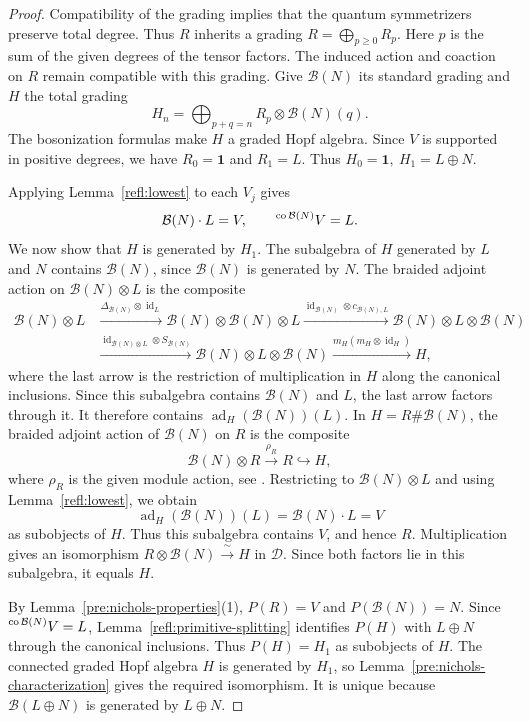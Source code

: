 \documentclass[11pt, a4paper]{article}
\numberwithin{equation}{section}
\newcommand{\D}{\mathcal D}
\newcommand{\B}{\mathcal B}
\newcommand{\one}{\mathbf 1}
\DeclareMathOperator{\id}{id}
\DeclareMathOperator{\ad}{ad}
\DeclareMathOperator{\co}{co}
\begin{document}
\begin{proof}
Compatibility of the grading implies that the quantum
symmetrizers preserve total degree. Thus $R$ inherits a grading
$
 R=\bigoplus_{p\geq0}R_p.
$
Here $p$ is the sum of the given degrees of the tensor factors.
The induced action and coaction on $R$ remain compatible
with this grading.
Give $\B(N)$ its standard grading and $H$ the total grading
\[
 H_n=\bigoplus_{p+q=n}R_p\otimes\B(N)(q).
\]
The bosonization formulas make $H$ a graded Hopf algebra.
Since $V$ is supported in positive degrees, we have
$R_0=\one$ and $R_1=L$. Thus
$
 H_0=\one,\ H_1=L\oplus N.
$

Applying Lemma~\ref{refl:lowest} to each $V_j$ gives
\[
 \B(N)\cdot L=V,
 \qquad
 \prescript{\co\B(N)}{}{V}=L.
\]
We now show that $H$ is generated by $H_1$.
The subalgebra of $H$ generated by $L$ and $N$
contains $\B(N)$, since $\B(N)$ is generated by $N$.
The braided adjoint action on $\B(N)\otimes L$ is the composite
\[
\begin{aligned}
 \B(N)\otimes L
 &\xrightarrow{\Delta_{\B(N)}\otimes\id_L}
 \B(N)\otimes\B(N)\otimes L
 \xrightarrow{\id_{\B(N)}\otimes c_{\B(N),L}}
 \B(N)\otimes L\otimes\B(N)\\
 &\xrightarrow{\id_{\B(N)\otimes L}\otimes S_{\B(N)}}
 \B(N)\otimes L\otimes\B(N)
 \xrightarrow{m_H(m_H\otimes\id_H)} H,
\end{aligned}
\]
where the last arrow is the restriction of multiplication
in $H$ along the canonical inclusions.
 {Since this} subalgebra contains $\B(N)$ and $L$, the last
arrow  {factors through it}.  {It therefore contains}
$\ad_H(\B(N))(L)$.
In $H=R\#\B(N)$, the braided adjoint action of $\B(N)$
on $R$ is the composite
\[
 \B(N)\otimes R\xrightarrow{\rho_R}R\hookrightarrow H,
\]
where $\rho_R$ is the given module action, {  see
\cite[Theorem~3.9.2 and Corollary~3.9.3(1)]{rootsys}}.
Restricting to $\B(N)\otimes L$ and using
Lemma~\ref{refl:lowest}, we obtain
\[
 \ad_H(\B(N))(L)=\B(N)\cdot L=V
\]
as subobjects of $H$.
Thus  {this} subalgebra contains $V$,  {and hence} $R$.
 {Multiplication} gives an isomorphism
$
 R\otimes\B(N)\xrightarrow{\ \sim\ }H
$
in $\D$.
 {Since both factors lie in this} subalgebra, it equals $H$.

 { By Lemma~\ref{pre:nichols-properties}(1)},
$P(R)=V$  {and} $P(\B(N))=N$.
 {Since} $\prescript{\co\B(N)}{}{V}=L$,
Lemma~\ref{refl:primitive-splitting}  {identifies} $P(H)$
with $  L\oplus N   $  {through} the  {canonical inclusions}.
Thus $P(H)=H_1$ as subobjects of $H$.
The  {connected graded} Hopf algebra $H$ is generated by $H_1$,
 {so} Lemma~\ref{pre:nichols-characterization} gives the required
isomorphism.
It is unique because $\B(L\oplus N)$ is generated by
$L\oplus N$.

\end{proof}
\end{document}
